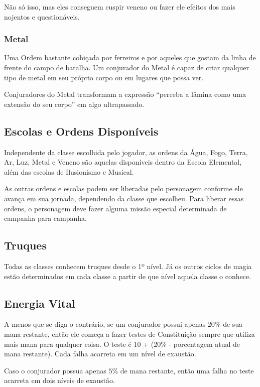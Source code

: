 \begin{multicols}{2}
Não só isso, mas eles conseguem cuspir veneno ou fazer ele efeitos dos mais
nojentos e questionáveis.

\subsubsection*{Metal}%

Uma Ordem bastante cobiçada por ferreiros e por aqueles que gostam da linha de
frente do campo de batalha. Um conjurador do Metal é capaz de criar qualquer
tipo de metal em seu próprio corpo ou em lugares que possa ver.

Conjuradores do Metal transformam a expressão ``perceba a lâmina como uma
extensão do seu corpo'' em algo ultrapassado.

\subsection*{Escolas e Ordens Disponíveis}%

Independente da classe escolhida pelo jogador, as ordens da Água, Fogo, Terra,
Ar, Luz, Metal e Veneno são aquelas disponíveis dentro da Escola Elemental, além
das escolas de Ilusionismo e Musical.

As outras ordens e escolas podem ser liberadas pelo personagem conforme ele
avança em sua jornada, dependendo da classe que escolheu. Para liberar essas
ordens, o personagem deve fazer alguma missão especial determinada de campanha
para campanha.

\subsection*{Truques}%

Todas as classes conhecem truques desde o 1º nível. Já os outros ciclos de magia
estão determinados em cada classe a partir de que nível aquela classe o conhece.

\subsection*{Energia Vital}%

A menos que se diga o contrário, se um conjurador possui apenas $20\%$ de sua
mana restante, então ele começa a fazer testes de Constituição sempre que
utiliza mais mana para qualquer coisa. O teste é 10 + (20\% - porcentagem atual
de mana restante).  Cada falha acarreta em um nível de exaustão.

Caso o conjurador possua apenas $5\%$ de mana restante, então uma falha no teste
acarreta em dois níveis de exaustão.


\end{multicols}
